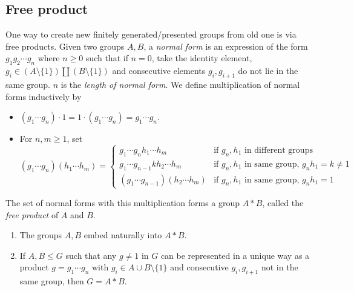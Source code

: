 \documentclass[a4paper]{article}
\begin{document}
\subsection{Free product}

One way to create new finitely generated/presented groups from old one is via free products. Given two groups \(A, B\), a \emph{normal form} is an expression of the form \(g_1g_2 \cdots g_n\) where \(n \geq 0\) such that if \(n = 0\), take the identity element, \(g_i \in (A \setminus \{1\}) \amalg (B \setminus \{1\})\) and consecutive elements \(g_i, g_{i + 1}\) do not lie in the same group. \(n\) is the \emph{length of normal form}. We define multiplication of normal forms inductively by
\begin{itemize}
\item \((g_1 \cdots g_n) \cdot 1 = 1 \cdot (g_1 \cdots g_n) = g_1 \cdots g_n\).
\item For \(n, m \geq 1\), set
  \[
    (g_1 \cdots g_n)(h_1 \cdots h_m) =
    \begin{cases}
      g_1 \cdots g_nh_1 \cdots h_m & \text{if \(g_n, h_1\) in different groups} \\
      g_1 \cdots g_{n - 1}kh_2 \cdots h_m & \text{if \(g_n, h_1\) in same group, \(g_nh_1 = k \ne 1\)} \\
      (g_1 \cdots g_{n - 1})(h_2 \cdots h_m) & \text{if \(g_n, h_1\) in same group, \(g_nh_1 = 1\)}
    \end{cases}
  \]
\end{itemize}

\begin{definition}
  The set of normal forms with this multiplication forms a group \(A * B\), called the \emph{free product} of \(A\) and \(B\).
\end{definition}

\begin{remark}\leavevmode
  \begin{enumerate}
  \item The groups \(A, B\) embed naturally into \(A * B\).
  \item If \(A, B \leq G\) such that any \(g \ne 1\) in \(G\) can be represented in a unique way as a product \(g = g_1 \cdots g_n\) with \(g_i \in A \cup B \setminus \{1\}\) and consecutive \(g_i, g_{i + 1}\) not in the same group, then \(G = A * B\).
  \end{enumerate}
\end{remark}
\end{document}
